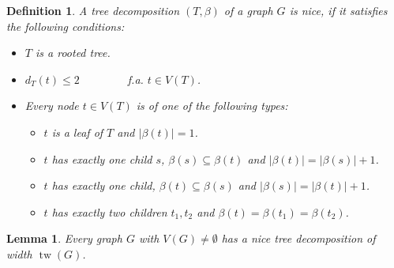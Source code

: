 \documentclass[11pt,a4paper]{article}
\newtheorem*{definition}{Definition}
\newtheorem*{lemma}{Lemma}
\DeclareMathOperator{\tw}{tw}
\begin{document}
\begin{definition}
A tree decomposition $(T, \beta)$ of a graph $G$ is \emph{nice}, if it satisfies the following conditions: 

\begin{itemize}
\item $T$ is a rooted tree.
\item $d_{T}(t) \leq 2 \qquad \qquad$ f.a. $t \in V(T)$.
\item Every node $t \in V(T)$ is of one of the following types:
\begin{itemize}
\item [\textbf{leaf}] $t$ is a leaf of $T$ and $|\beta(t)| = 1$.
\item [\textbf{introduce}] $t$ has exactly one child $s$, $\beta(s) \subseteq \beta(t)$ and $|\beta(t)| = |\beta(s)| + 1$.
\item [\textbf{forget}] $t$ has exactly one child, $\beta(t) \subseteq \beta(s)$ and $|\beta(s)| = |\beta(t)| + 1$.
\item [\textbf{join}] $t$ has exactly two children $t_{1}, t_{2}$ and $\beta(t) = \beta(t_{1}) = \beta(t_{2})$.
\end{itemize}
\end{itemize}
 
\end{definition}

\begin{lemma}
Every graph $G$ with $V(G) \not = \emptyset$ has a nice tree decomposition of width $\tw(G)$.
\end{lemma}
\end{document}
